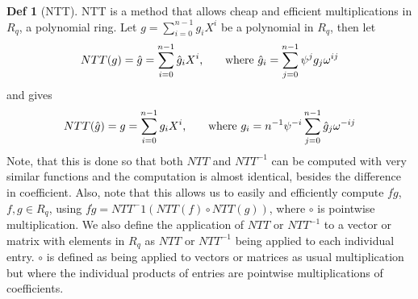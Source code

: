 \documentclass[a4paper, 10pt]{article}
\theoremstyle{definition}
\newtheorem{definition}{Def}[section]
\begin{document}
\begin{definition}[\ac{NTT}]
    \ac{NTT} is a method that allows cheap and efficient multiplications in $R_q$, a polynomial ring. Let $g=\sum_{i=0}^{n-1}g_iX^i$ be a polynomial in $R_q$, then let
    \[NTT(g)=\hat{g}=\sum_{i=0}^{n-1}\hat{g}_iX^i \mbox{,\qquad where } \hat{g}_i = \sum_{j=0}^{n-1}\psi ^jg_j\omega ^{ij}\]
    and gives
    \[NTT(\hat{g})=g=\sum_{i=0}^{n-1}g_iX^i \mbox{,\qquad where } g_i = n^{-1}\psi ^{-i}\sum^{n-1}_{j=0}\hat{g}_j\omega ^{-ij}\]
    Note, that this is done so that both $NTT$ and $NTT^{-1}$ can be computed with very similar functions and the computation is almost identical, besides the difference in coefficient. Also, note that this allows us to easily and efficiently compute $f \dot g$, $f,g \in R_q$, using $f \dot g = NTT^-1(NTT(f)\circ NTT(g))$, where $\circ$ is pointwise multiplication. We also define the application of $NTT$ or $NTT^{-1}$ to a vector or matrix with elements in $R_q$ as $NTT$ or $NTT^{-1}$ being applied to each individual entry. $\circ$ is defined as being applied to vectors or matrices as usual multiplication but where the individual products of entries are pointwise multiplications of coefficients.
\end{definition}
\end{document}
